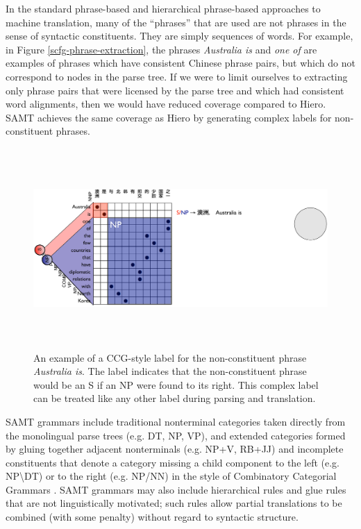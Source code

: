In the standard phrase-based and hierarchical phrase-based approaches to machine translation, many of the ``phrases'' that are used are not phrases in the sense of syntactic constituents.  They are simply sequences of words.  For example, in Figure \ref{scfg-phrase-extraction}, the phrases {\it Australia is} and {\it one of} are examples of phrases which have consistent Chinese phrase pairs, but which do not correspond to nodes in the parse tree.  If we were to limit ourselves to extracting only phrase pairs that were licensed by the parse tree and which had consistent word alignments, then we would have reduced coverage compared to Hiero.  SAMT \cite{samt} achieves the same coverage as Hiero by generating complex labels for non-constituent phrases.  


\begin{figure}
\begin{center}
\includegraphics[height=3in]{SCFGs/scfg-ccg-phrase-extraction.pdf}
\end{center}
\caption{An example of a CCG-style label for the non-constituent phrase {\it Australia is}.  The label indicates that the non-constituent phrase would be an S if an NP were found to its right.  This complex label can be treated like any other label during parsing and translation. }\label{scfg-ccg-phrase-extraction}
\end{figure}


SAMT grammars include traditional nonterminal categories taken directly from the monolingual parse trees (e.g. DT, NP, VP), and extended categories formed by gluing together adjacent nonterminals (e.g. NP+V, RB+JJ) and incomplete constituents that denote a category missing a child component to the left (e.g.  NP\textbackslash DT) or to the right (e.g. NP/NN) in the style of Combinatory Categorial Grammars \cite{ccg1982}.   SAMT grammars may also include hierarchical rules and glue rules \cite{chiang:2007} that are not linguistically motivated; such rules allow partial translations to be combined (with some penalty) without regard to syntactic structure.

